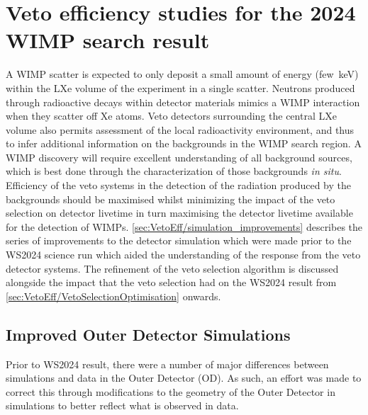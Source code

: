 \chapter{Veto efficiency studies for the 2024 WIMP search result}\label{chap:VetoEfficiency}
A WIMP scatter is expected to only deposit a small amount of energy (few~keV) within the LXe volume of the experiment in a single scatter. Neutrons produced through radioactive decays within detector materials mimics a WIMP interaction when they scatter off Xe atoms. Veto detectors surrounding the central LXe volume also permits assessment of the local radioactivity environment, and thus to infer additional information on the backgrounds in the WIMP search region. A WIMP discovery will require excellent understanding of all background sources, which is best done through the characterization of those backgrounds \textit{in situ}. Efficiency of the veto systems in the detection of the radiation produced by the backgrounds should be maximised whilst minimizing the impact of the veto selection on detector livetime in turn maximising the detector livetime available for the detection of WIMPs. \autoref{sec:VetoEff/simulation_improvements} describes the series of improvements to the detector simulation which were made prior to the WS2024 science run which aided the understanding of the response from the veto detector systems. The refinement of the veto selection algorithm is discussed alongside the impact that the veto selection had on the WS2024 result from \autoref{sec:VetoEff/VetoSelectionOptimisation} onwards.

\section{Improved Outer Detector Simulations}\label{sec:VetoEff/simulation_improvements}
Prior to WS2024 result, there were a number of major differences between simulations and data in the Outer Detector (OD). As such, an effort was made to correct this through modifications to the geometry of the Outer Detector in simulations to better reflect what is observed in data.
